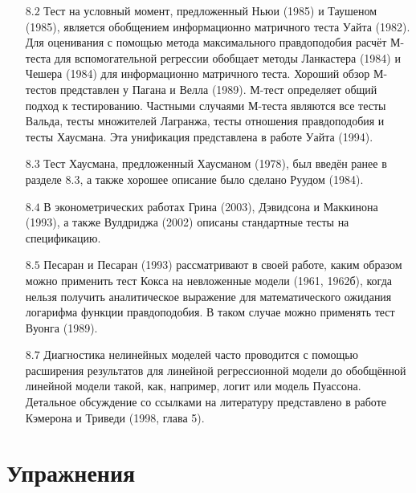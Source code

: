 \begin{itemize}
\item [$8.2$] Тест на условный момент, предложенный Ньюи (1985) и Таушеном (1985), является обобщением информационно матричного теста Уайта (1982). Для оценивания с помощью метода максимального правдоподобия расчёт М-теста для вспомогательной регрессии обобщает методы Ланкастера (1984) и Чешера (1984) для информационно матричного теста. Хороший обзор М-тестов представлен у Пагана и Велла (1989). М-тест определяет общий подход к тестированию. Частными случаями М-теста являются  все тесты Вальда, тесты множителей Лагранжа, тесты отношения правдоподобия и тесты Хаусмана. Эта унификация представлена в работе Уайта (1994).
\item [$8.3$] Тест Хаусмана, предложенный Хаусманом (1978), был введён ранее в разделе 8.3, а также хорошее описание было сделано Руудом (1984).
\item [$8.4$] В эконометрических работах Грина (2003), Дэвидсона и Маккинона (1993), а также Вулдриджа (2002) описаны стандартные тесты на спецификацию. 
\item [$8.5$] Песаран и Песаран (1993) рассматривают в своей работе, каким образом можно применить тест Кокса на невложенные модели (1961, 1962б), когда нельзя получить аналитическое выражение для математического ожидания логарифма функции правдоподобия. В таком случае можно применять тест Вуонга (1989).
\item [$8.7$] Диагностика нелинейных моделей часто проводится с помощью расширения результатов для линейной регрессионной модели до обобщённой линейной модели такой, как, например, логит или модель Пуассона. Детальное обсуждение со ссылками на литературу представлено в работе Кэмерона и Триведи (1998, глава 5).
\end{itemize}


\section{Упражнения}

